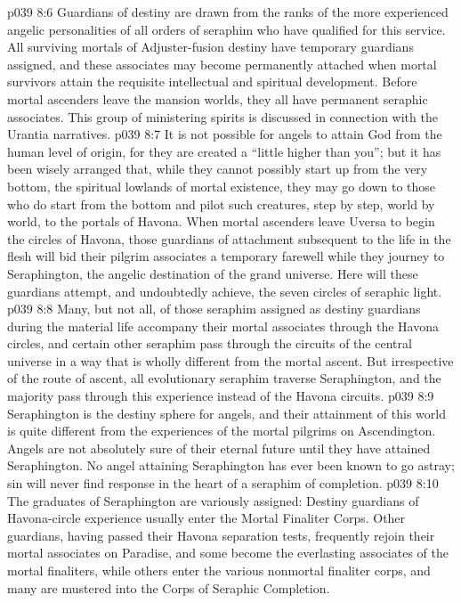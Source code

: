 \vs p039 8:6 Guardians of destiny are drawn from the ranks of the more experienced angelic personalities of all orders of seraphim who have qualified for this service. All surviving mortals of Adjuster\hyp{}fusion destiny have temporary guardians assigned, and these associates may become permanently attached when mortal survivors attain the requisite intellectual and spiritual development. Before mortal ascenders leave the mansion worlds, they all have permanent seraphic associates. This group of ministering spirits is discussed in connection with the Urantia narratives.
\vs p039 8:7 \pc It is not possible for angels to attain God from the human level of origin, for they are created a “little higher than you”; but it has been wisely arranged that, while they cannot possibly start up from the very bottom, the spiritual lowlands of mortal existence, they may go down to those who do start from the bottom and pilot such creatures, step by step, world by world, to the portals of Havona. When mortal ascenders leave Uversa to begin the circles of Havona, those guardians of attachment subsequent to the life in the flesh will bid their pilgrim associates a temporary farewell while they journey to Seraphington, the angelic destination of the grand universe. Here will these guardians attempt, and undoubtedly achieve, the seven circles of seraphic light.
\vs p039 8:8 Many, but not all, of those seraphim assigned as destiny guardians during the material life accompany their mortal associates through the Havona circles, and certain other seraphim pass through the circuits of the central universe in a way that is wholly different from the mortal ascent. But irrespective of the route of ascent, all evolutionary seraphim traverse Seraphington, and the majority pass through this experience instead of the Havona circuits.
\vs p039 8:9 \pc Seraphington is the destiny sphere for angels, and their attainment of this world is quite different from the experiences of the mortal pilgrims on Ascendington. Angels are not absolutely sure of their eternal future until they have attained Seraphington. No angel attaining Seraphington has ever been known to go astray; sin will never find response in the heart of a seraphim of completion.
\vs p039 8:10 The graduates of Seraphington are variously assigned: Destiny guardians of Havona\hyp{}circle experience usually enter the Mortal Finaliter Corps. Other guardians, having passed their Havona separation tests, frequently rejoin their mortal associates on Paradise, and some become the everlasting associates of the mortal finaliters, while others enter the various nonmortal finaliter corps, and many are mustered into the Corps of Seraphic Completion.
